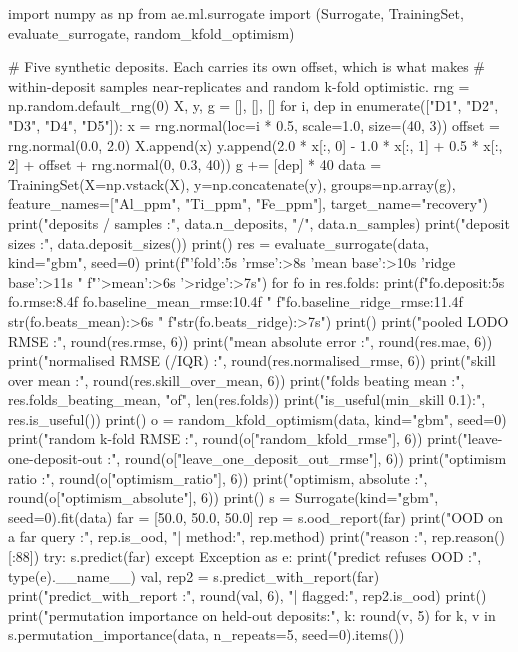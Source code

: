 \documentclass[10pt,a4paper,twoside]{report}
\begin{document}
\begin{doctestblock}
import numpy as np
from ae.ml.surrogate import (Surrogate, TrainingSet, evaluate_surrogate,
                             random_kfold_optimism)

# Five synthetic deposits. Each carries its own offset, which is what makes
# within-deposit samples near-replicates and random k-fold optimistic.
rng = np.random.default_rng(0)
X, y, g = [], [], []
for i, dep in enumerate(["D1", "D2", "D3", "D4", "D5"]):
    x = rng.normal(loc=i * 0.5, scale=1.0, size=(40, 3))
    offset = rng.normal(0.0, 2.0)
    X.append(x)
    y.append(2.0 * x[:, 0] - 1.0 * x[:, 1] + 0.5 * x[:, 2] + offset + rng.normal(0, 0.3, 40))
    g += [dep] * 40
data = TrainingSet(X=np.vstack(X), y=np.concatenate(y), groups=np.array(g),
                   feature_names=["Al_ppm", "Ti_ppm", "Fe_ppm"], target_name="recovery")
print("deposits / samples      :", data.n_deposits, "/", data.n_samples)
print("deposit sizes           :", data.deposit_sizes())
print()
res = evaluate_surrogate(data, kind="gbm", seed=0)
print(f"{'fold':5s} {'rmse':>8s} {'mean base':>10s} {'ridge base':>11s} "
      f"{'>mean':>6s} {'>ridge':>7s}")
for fo in res.folds:
    print(f"{fo.deposit:5s} {fo.rmse:8.4f} {fo.baseline_mean_rmse:10.4f} "
          f"{fo.baseline_ridge_rmse:11.4f} {str(fo.beats_mean):>6s} "
          f"{str(fo.beats_ridge):>7s}")
print()
print("pooled LODO RMSE        :", round(res.rmse, 6))
print("mean absolute error     :", round(res.mae, 6))
print("normalised RMSE (/IQR)  :", round(res.normalised_rmse, 6))
print("skill over mean         :", round(res.skill_over_mean, 6))
print("folds beating mean      :", res.folds_beating_mean, "of", len(res.folds))
print("is_useful(min_skill 0.1):", res.is_useful())
print()
o = random_kfold_optimism(data, kind="gbm", seed=0)
print("random k-fold RMSE      :", round(o["random_kfold_rmse"], 6))
print("leave-one-deposit-out   :", round(o["leave_one_deposit_out_rmse"], 6))
print("optimism ratio          :", round(o["optimism_ratio"], 6))
print("optimism, absolute      :", round(o["optimism_absolute"], 6))
print()
s = Surrogate(kind="gbm", seed=0).fit(data)
far = [50.0, 50.0, 50.0]
rep = s.ood_report(far)
print("OOD on a far query      :", rep.is_ood, "| method:", rep.method)
print("reason                  :", rep.reason()[:88])
try:
    s.predict(far)
except Exception as e:
    print("predict refuses OOD     :", type(e).__name__)
val, rep2 = s.predict_with_report(far)
print("predict_with_report     :", round(val, 6), "| flagged:", rep2.is_ood)
print()
print("permutation importance on held-out deposits:",
      {k: round(v, 5) for k, v in s.permutation_importance(data, n_repeats=5, seed=0).items()})
\end{doctestblock}
\end{document}
